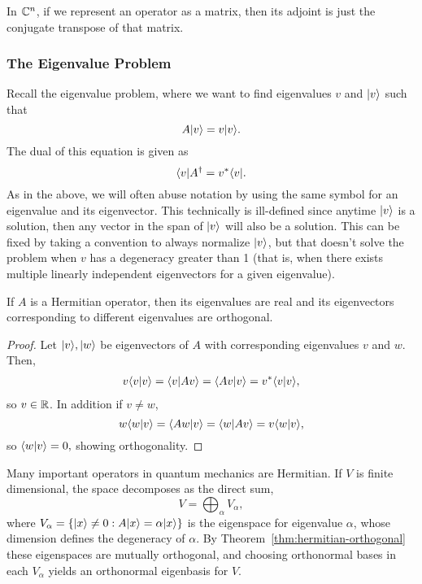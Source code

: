 \begin{example} In $\mathbb{C}^n$, if we represent an operator as a matrix, then its adjoint is just the conjugate transpose of that matrix.
\end{example}

\subsubsection{The Eigenvalue Problem}

Recall the eigenvalue problem, where we want to find eigenvalues $v$ and $\lvert v \rangle$ such that
$$A\lvert v \rangle = v\lvert v \rangle.$$
The dual of this equation is given as
$$\langle v \rvert A^\dagger = v^*\langle v \rvert.$$
As in the above, we will often abuse notation by using the same symbol for an eigenvalue and its eigenvector. This technically is ill-defined since anytime $\lvert v \rangle$ is a solution, then any vector in the span of $\lvert v \rangle$ will also be a solution. This can be fixed by taking a convention to always normalize $\lvert v \rangle$, but that doesn't solve the problem when $v$ has a degeneracy greater than 1 (that is, when there exists multiple linearly independent eigenvectors for a given eigenvalue).

\begin{theorem}
    If $A$ is a Hermitian operator, then its eigenvalues are real and its eigenvectors corresponding to different eigenvalues are orthogonal.
    \label{thm:hermitian-orthogonal}
\end{theorem}
\begin{proof}
    Let $\lvert v \rangle,\lvert w \rangle$ be eigenvectors of $A$ with corresponding eigenvalues $v$ and $w$. Then,
    \begin{align*}
        v\langle v\vert v \rangle = \langle v\vert Av \rangle = \langle A v\vert v \rangle = v^*\langle v\vert v \rangle,
    \end{align*}
    so $v\in \mathbb{R}$. In addition if $v \neq w$,
    $$w\langle w\vert v \rangle = \langle Aw\vert v \rangle = \langle w\vert Av \rangle = v\langle w\vert v \rangle,$$
    so $\langle w\vert v \rangle = 0,$ showing orthogonality.
\end{proof}

Many important operators in quantum mechanics are Hermitian. If $V$ is finite dimensional, the space decomposes as the direct sum,
\[
V=\bigoplus_{\alpha} V_{\alpha},
\]
where $V_\alpha=\{\lvert x \rangle\neq 0: A\lvert x \rangle=\alpha\lvert x \rangle\}$ is the eigenspace for eigenvalue $\alpha$, whose dimension defines the degeneracy of $\alpha$. By Theorem~\ref{thm:hermitian-orthogonal} these eigenspaces are mutually orthogonal, and choosing orthonormal bases in each $V_\alpha$ yields an orthonormal eigenbasis for $V$.


